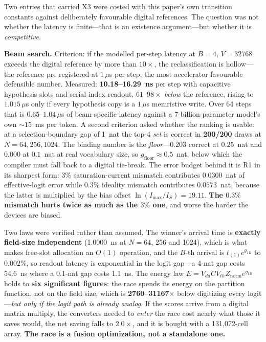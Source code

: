 \documentclass[11pt]{article}
\begin{document}
Two entries that carried X3 were costed with this paper's own transition constants against deliberately favourable digital references. The question was not whether the latency is finite---that is an existence argument---but whether it is \textit{competitive}.

\textbf{Beam search.} Criterion: if the modelled per-step latency at $B=4$, $V = 32768$ exceeds the digital reference by more than $10\times$, the reclassification is hollow---the reference pre-registered at $1\,\mu$s per step, the most accelerator-favourable defensible number. Measured: \textbf{10.18--16.29~ns} per step with capacitive hypothesis slots and serial index readout, $61$--$98\times$ \textit{below} the reference, rising to $1.015\,\mu$s only if every hypothesis copy is a $1\,\mu$s memristive write. Over 64 steps that is $0.65$--$1.04\,\mu$s of beam-specific latency against a 7-billion-parameter model's own ${\sim}15$~ms per token. A second criterion asked whether the ranking is usable: at a selection-boundary gap of 1~nat the top-4 \textit{set} is correct in \textbf{200/200} draws at $N = 64, 256, 1024$. The binding number is the \textit{floor}---$0.203$ correct at $0.25$~nat and $0.000$ at $0.1$~nat at real vocabulary size, so $g_{\mathrm{floor}} \approx 0.5$~nat, below which the compiler must fall back to a digital tie-break. The error budget behind it is R1 in its sharpest form: $3\%$ saturation-current mismatch contributes $0.0300$~nat of effective-logit error while $0.3\%$ ideality mismatch contributes $\mathbf{0.0573}$~nat, because the latter is multiplied by the bias offset $\ln(I_{\max}/I_S) = 19.11$. \textbf{The $0.3\%$ mismatch hurts twice as much as the $3\%$ one}, and worse the harder the devices are biased.

Two laws were verified rather than assumed. The winner's arrival time is \textbf{exactly field-size independent} (1.0000~ns at $N = 64$, 256 and 1024), which is what makes free-slot allocation an $O(1)$ operation, and the $B$-th arrival is $t_{(1)}e^{g_{1B}}$ to $0.002\%$, so readout latency is exponential in the logit gap---a 4-nat gap costs 54.6~ns where a 0.1-nat gap costs 1.1~ns. The energy law $E = V_{dd}CV_{th}Z_{\mathrm{norm}}e^{g_{1B}}$ holds to \textbf{six significant figures}: the race spends its energy on the partition function, not on the field size, which is \textbf{2760--31167$\times$} below digitizing every logit---\textit{but only if the logit path is already analog}. If the scores arrive from a digital matrix multiply, the converters needed to \textit{enter} the race cost nearly what those it saves would, the net saving falls to $2.0\times$, and it is bought with a 131{,}072-cell array. \textbf{The race is a fusion optimization, not a standalone one.}
\end{document}
